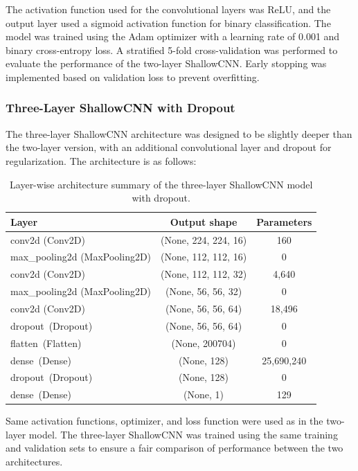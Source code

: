 \documentclass[12pt]{article}
\begin{document}
\noindent
The activation function used for the convolutional layers was ReLU, and the output layer used a sigmoid activation function for binary classification. The model was trained using the Adam optimizer with a learning rate of 0.001 and binary cross-entropy loss.
A stratified 5-fold cross-validation was performed to evaluate the performance of the two-layer ShallowCNN. Early stopping was implemented based on validation loss to prevent overfitting.

\subsubsection{Three-Layer ShallowCNN with Dropout}

The three-layer ShallowCNN architecture was designed to be slightly deeper than the two-layer version, with an additional convolutional layer and dropout for regularization. The architecture is as follows:

\begin{table}[!htbp]
    \centering
    \begin{tabular}{lcc}
        \toprule
        Layer & Output shape & Parameters \\
        \midrule
        conv2d (Conv2D) & (None, 224, 224, 16) & 160 \\
        max\_pooling2d (MaxPooling2D) & (None, 112, 112, 16) & 0 \\
        conv2d (Conv2D) & (None, 112, 112, 32) & 4,640 \\
        max\_pooling2d (MaxPooling2D) & (None, 56, 56, 32) & 0 \\
        conv2d (Conv2D) & (None, 56, 56, 64) & 18,496 \\
        dropout\ (Dropout) & (None, 56, 56, 64) & 0 \\
        flatten\ (Flatten) & (None, 200704) & 0 \\
        dense\ (Dense) & (None, 128) & 25,690,240 \\
        dropout\ (Dropout) & (None, 128) & 0 \\
        dense\ (Dense) & (None, 1) & 129 \\
        \bottomrule
    \end{tabular}
    \caption{Layer-wise architecture summary of the three-layer ShallowCNN model with dropout.}
    \label{tab:threelayercnn}
\end{table}

\noindent
Same activation functions, optimizer, and loss function were used as in the two-layer model. The three-layer ShallowCNN was trained using the same training and validation sets to ensure a fair comparison of performance between the two architectures.
\end{document}

